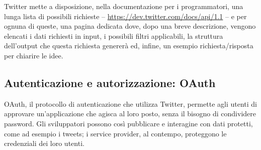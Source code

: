 	Twitter mette a disposizione, nella documentazione per i programmatori\cite{twitter_doc}, una lunga lista di possibili richieste -- \url{https://dev.twitter.com/docs/api/1.1} -- e per ognuna di queste, una pagina dedicata dove, dopo una breve descrizione, vengono elencati i dati richiesti in input, i possibili filtri applicabili, la struttura dell'output che questa richiesta genererà ed, infine, un esempio richiesta/risposta per chiarire le idee.


	\subsection{Autenticazione e autorizzazione: OAuth}
	OAuth, il protocollo di autenticazione che utilizza Twitter\cite{twitter_auth}, permette agli utenti di approvare un'applicazione che agisca al loro posto, senza il bisogno di condividere password. Gli sviluppatori possono così pubblicare e interagine con dati protetti, come ad esempio i tweets; i service provider, al contempo, proteggono le credenziali dei loro utenti\cite{twitter_aut_faq}.
